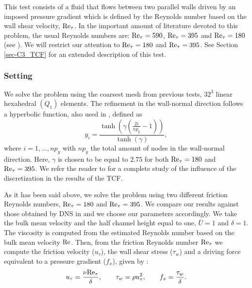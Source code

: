 This test consists of a fluid that flows between two parallel walls driven by an imposed pressure gradient which is defined by the Reynolds number based on the wall shear velocity, ${\rm Re}_\tau$. In the important amount of literature devoted to this problem, the usual Reynolds numbers are: ${\rm Re}_\tau=590$, ${\rm Re}_\tau=395$  and ${\rm Re}_\tau=180$ (see \cite{bazilevs_variational_2007, Calderer2013, gamnitzer_time-dependent_2010, gravemeier_algebraic_2010, gullbrand_effect_2003, hughes_large_2001, john_variants_2008, kim_turbulence_1987, masud_variational_2011, moser_direct_1999}). We will restrict our attention to ${\rm Re}_\tau=180$ and ${\rm Re}_\tau=395$. See Section \ref{sec-C3_TCF} for an extended description of this test.

\subsubsection{Setting}
\label{subsubsec-C4_TCF_setting}

We solve the problem using the coarsest mesh from previous tests, $32^3$ linear hexahedral $(Q_1)$ elements. The refinement in the wall-normal direction follows a hyperbolic function, also used in \cite{Calderer2013,  gamnitzer_time-dependent_2010,  gravemeier_algebraic_2010, gullbrand_effect_2003, masud_variational_2011}, defined as 
$$y_i=\frac{\tanh\left(\gamma\left(\frac{2i}{np_y}-1\right)\right)}{\tanh(\gamma)},$$
where $i=1,...,np_y$ with $np_y$ the total amount of nodes in the wall-normal direction. Here, $\gamma$ is  chosen to be equal to $2.75$ for both  ${\rm Re}_\tau=180$ and ${\rm Re}_\tau=395$.  We refer the reader to \cite{Avila2014} for a complete study of the influence of the discretization in the results of the TCF.

As it has been said above, we solve the problem using two different friction Reynolds numbers, ${\rm Re}_\tau=180$ and ${\rm Re}_\tau=395$. We compare our results against those obtained by DNS in \cite{moser_direct_1999,kim_turbulence_1987} and we choose our parameters accordingly.
We take the bulk mean velocity and the half channel height equal to one, $\bar{U}=1$ and $\delta=1$. The viscosity is computed from the estimated Reynolds number based on the bulk mean velocity ${\rm Re}$. Then, from the friction Reynolds number ${\rm Re}_\tau$ we compute the friction velocity ($u_\tau$), the wall shear stress ($\tau_w$) and a driving force equivalent to a pressure gradient ($f_x$), given by  \cite{pope_turbulent_2000}:
$$u_\tau=\frac{\nu {\rm Re}_\tau}{\delta},\quad\quad\tau_w=\rho u_\tau^2,\quad\quad
f_x=\frac{\tau_w}{\delta}.$$

